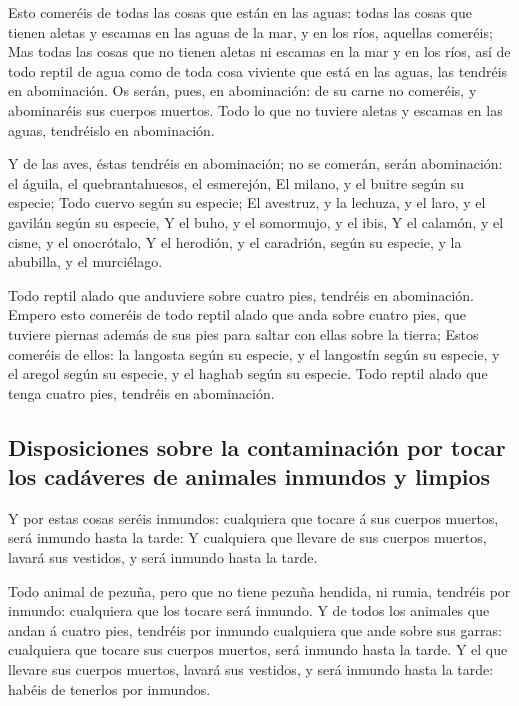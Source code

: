  Esto comeréis de todas las cosas que están en las aguas:
todas las cosas que tienen aletas y escamas en las aguas de la mar, y en
los ríos, aquellas comeréis;  Mas todas las cosas que no
tienen aletas ni escamas en la mar y en los ríos, así de todo reptil de
agua como de toda cosa viviente que está en las aguas, las tendréis en
abominación.  Os serán, pues, en abominación: de su carne
no comeréis, y abominaréis sus cuerpos muertos.  Todo lo
que no tuviere aletas y escamas en las aguas, tendréislo en abominación.

 Y de las aves, éstas tendréis en abominación; no se
comerán, serán abominación: el águila, el quebrantahuesos, el esmerejón,
 El milano, y el buitre según su especie; 
Todo cuervo según su especie;  El avestruz, y la lechuza,
y el laro, y el gavilán según su especie,  Y el buho, y
el somormujo, y el ibis,  Y el calamón, y el cisne, y el
onocrótalo,  Y el herodión, y el caradrión, según su
especie, y la abubilla, y el murciélago.

 Todo reptil alado que anduviere sobre cuatro pies,
tendréis en abominación.  Empero esto comeréis de todo
reptil alado que anda sobre cuatro pies, que tuviere piernas además de
sus pies para saltar con ellas sobre la tierra;  Estos
comeréis de ellos: la langosta según su especie, y el langostín según su
especie, y el aregol según su especie, y el haghab según su especie.
 Todo reptil alado que tenga cuatro pies, tendréis en
abominación.

\hypertarget{disposiciones-sobre-la-contaminaciuxf3n-por-tocar-los-caduxe1veres-de-animales-inmundos-y-limpios}{%
\subsection{Disposiciones sobre la contaminación por tocar los cadáveres
de animales inmundos y
limpios}\label{disposiciones-sobre-la-contaminaciuxf3n-por-tocar-los-caduxe1veres-de-animales-inmundos-y-limpios}}

 Y por estas cosas seréis inmundos: cualquiera que tocare
á sus cuerpos muertos, será inmundo hasta la tarde:  Y
cualquiera que llevare de sus cuerpos muertos, lavará sus vestidos, y
será inmundo hasta la tarde.

 Todo animal de pezuña, pero que no tiene pezuña hendida,
ni rumia, tendréis por inmundo: cualquiera que los tocare será inmundo.
 Y de todos los animales que andan á cuatro pies,
tendréis por inmundo cualquiera que ande sobre sus garras: cualquiera
que tocare sus cuerpos muertos, será inmundo hasta la tarde.
 Y el que llevare sus cuerpos muertos, lavará sus
vestidos, y será inmundo hasta la tarde: habéis de tenerlos por
inmundos.

